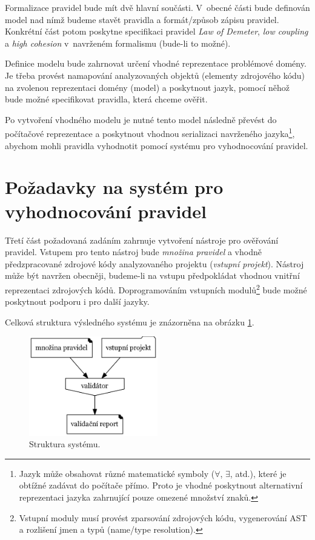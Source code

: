 Formalizace pravidel bude mít dvě hlavní součásti. V~obecné části bude definován model nad nímž budeme stavět pravidla a formát/způsob zápisu pravidel. Konkrétní část potom poskytne specifikaci pravidel \emph{Law of Demeter}, \emph{low coupling} a \emph{high cohesion} v~navrženém formalismu (bude-li to možné).

Definice modelu bude zahrnovat určení vhodné reprezentace problémové domény. Je třeba provést namapování analyzovaných objektů (elementy zdrojového kódu) na zvolenou reprezentaci domény (model) a poskytnout jazyk, pomocí něhož bude možné specifikovat pravidla, která chceme ověřit.

Po vytvoření vhodného modelu je nutné tento model následně převést do počítačové reprezentace a poskytnout vhodnou serializaci navrženého jazyka\footnote{Jazyk může obsahovat různé matematické symboly ($\forall$, $\exists$, atd.), které je obtížné zadávat do počítače přímo. Proto je vhodné poskytnout alternativní reprezentaci jazyka zahrnující pouze omezené množství znaků.}, abychom mohli pravidla vyhodnotit pomocí systému pro vyhodnocování pravidel.

\section{Požadavky na systém pro vyhodnocování pravidel}
\label{requirements-rules_evaluation}
Třetí část požadovaná zadáním zahrnuje vytvoření nástroje pro ověřování pravidel. Vstupem pro tento nástroj bude \emph{množina pravidel} a vhodně předzpracované zdrojové kódy analyzovaného projektu (\emph{vstupní projekt}). Nástroj může být navržen obecněji, budeme-li na vstupu předpokládat vhodnou vnitřní reprezentaci zdrojových kódů. Doprogramováním vstupních modulů\footnote{Vstupní moduly musí provést zparsování zdrojových kódu, vygenerování AST a rozlišení jmen a typů (name/type resolution).} bude možné poskytnout podporu i pro další jazyky.

Celková struktura výsledného systému je znázorněna na obrázku \ref{requirements-system_structure}.

\begin{figure}[h!]
  \centering
  \includegraphics[width=0.5\textwidth]{./graphs/global_structure.png}
  \caption{Struktura systému.\label{requirements-system_structure}}
\end{figure}

